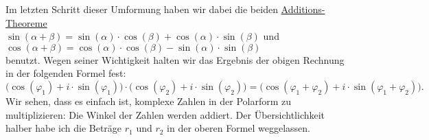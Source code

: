 Im letzten Schritt dieser Umformung haben wir dabei die beiden 
\href{https://de.wikipedia.org/wiki/Formelsammlung_Trigonometrie#Additionstheoreme}{Additions-Theoreme}
\\[0.2cm]
\hspace*{1.3cm}
$\sin(\alpha + \beta) = \sin(\alpha) \cdot \cos(\beta) + \cos(\alpha) \cdot \sin(\beta)$ \quad und
\\[0.2cm]
\hspace*{1.3cm}
$\cos(\alpha + \beta) = \cos(\alpha) \cdot \cos(\beta) - \sin(\alpha) \cdot \sin(\beta)$
\\[0.2cm]
benutzt.   Wegen seiner Wichtigkeit halten wir das Ergebnis der obigen Rechnung in der folgenden Formel
fest:
\begin{equation}
  \label{eq:komplex_mult2}
  \bigl(\cos(\varphi_1) + i \cdot \sin(\varphi_1)\bigr) \cdot
  \bigl(\cos(\varphi_2) + i \cdot \sin(\varphi_2)\bigr)       
= \bigl(\cos(\varphi_1 + \varphi_2) + i \cdot \sin(\varphi_1 + \varphi_2) \bigr).
\end{equation}
Wir sehen, dass es einfach ist, komplexe Zahlen in der Polarform zu
multiplizieren: Die Winkel der Zahlen werden addiert.  Der \"{U}bersichtlichkeit halber habe ich
die Betr\"{a}ge $r_1$ und $r_2$ in der oberen Formel weggelassen.  

